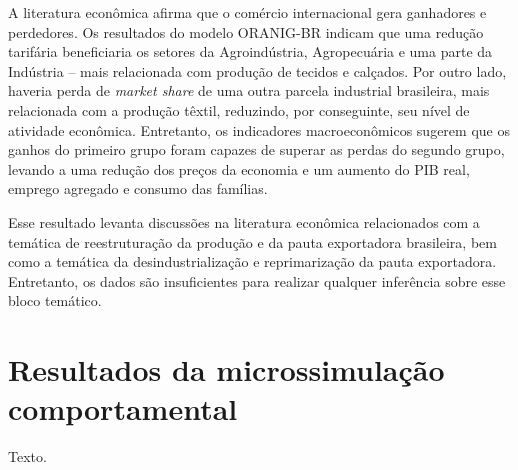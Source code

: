 A literatura econômica afirma que o comércio internacional gera ganhadores e perdedores. Os resultados do modelo ORANIG-BR indicam que uma redução tarifária beneficiaria os setores da Agroindústria, Agropecuária e uma parte da Indústria -- mais relacionada com produção de tecidos e calçados. Por outro lado, haveria perda de \textit{market share} de uma outra parcela industrial brasileira, mais relacionada com a produção têxtil, reduzindo, por conseguinte, seu nível de atividade econômica. Entretanto, os indicadores macroeconômicos sugerem que os ganhos do primeiro grupo foram capazes de superar as perdas do segundo grupo, levando a uma redução dos preços da economia e um aumento do PIB real, emprego agregado e consumo das famílias.

Esse resultado levanta discussões na literatura econômica relacionados com a temática de reestruturação da produção e da pauta exportadora brasileira, bem como a temática da desindustrialização e reprimarização da pauta exportadora. Entretanto, os dados são insuficientes para realizar qualquer inferência sobre esse bloco temático.



\section{Resultados da microssimulação comportamental} \label{sec:microssimulacao}

Texto.